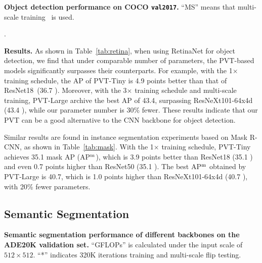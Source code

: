 \documentclass[10pt,twocolumn,letterpaper]{article}
\begin{document}
\begin{table*}[t]
    \centering
    \renewcommand\arraystretch{ 1.0}
    \setlength{\tabcolsep}{1.9mm}
    \footnotesize
    
     
    \caption{\textbf{Object detection performance on COCO \texttt{val2017}.} 
    ``MS'' means that multi-scale training~\cite{lin2017focal,he2017mask} is used.}
    \label{tab:retina} 
\end{table*}

\begin{table*}[t]
    \centering
    \renewcommand\arraystretch{.9}
    \setlength{\tabcolsep}{1.4mm}
    \footnotesize
    
     
    \caption{\textbf{Object detection and instance segmentation performance on COCO \texttt{val2017}.}
    AP$^{\rm b}$ and AP$^{\rm m}$ denote bounding box AP and mask AP, respectively. 
    }
    \label{tab:mask}.
\end{table*}

\noindent\textbf{Results.}
As shown in Table~\ref{tab:retina}, when using RetinaNet for object detection, we find that under comparable number of parameters, the PVT-based models significantly surpasses their counterparts. 
For example, with the 1$\times$ training schedule, the AP of PVT-Tiny is 4.9 points better than that of ResNet18~(36.7 ).
Moreover, with the 3$\times$ training schedule and multi-scale training, PVT-Large archive the best AP of 43.4, surpassing ResNeXt101-64x4d (43.4 ), while our parameter number is 30\% fewer.
%
These results indicate that our PVT can be a good alternative to the CNN backbone for object detection.

Similar results are found in instance segmentation experiments based on Mask R-CNN, as shown in Table~\ref{tab:mask}.
With the 1$\times$ training schedule, PVT-Tiny achieves 35.1 mask AP (AP$^{\rm m}$), which is 3.9 points better than ResNet18 (35.1 ) and even 0.7 points higher than ResNet50 (35.1 ). 
The best AP$^{\rm m}$ obtained by PVT-Large is 40.7, which is 1.0 points higher than ResNeXt101-64x4d (40.7 ), with 20\% fewer parameters.


\subsection{Semantic Segmentation}\label{sec:seg}


\begin{table}[t]
    \centering
    \renewcommand\arraystretch{ 1.0}
    \setlength{\tabcolsep}{2.4mm}
    \footnotesize
    
     
    \caption{\textbf{Semantic segmentation performance of different backbones on the ADE20K validation set.}
    ``GFLOPs'' is calculated under the input scale of $512\times 512$.
    ``*'' indicates 320K iterations training and multi-scale flip testing.
    }
    \label{tab:seg}
\end{table}
\end{document}
